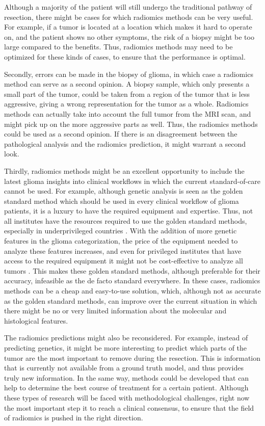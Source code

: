 Although a majority of the patient will still undergo the traditional pathway of resection, there might be cases for which radiomics methods can be very useful.
For example, if a \gls{tumor} is located at a location which makes it hard to operate on, and the patient shows no other symptoms, the risk of a biopsy might be too large compared to the benefits.
Thus, radiomics methods may need to be optimized for these kinds of cases, to ensure that the performance is optimal.

Secondly, errors can be made in the biopsy of glioma, in which case a radiomics method can serve as a second opinion.
A biopsy sample, which only presents a small part of the \gls{tumor}, could be taken from a region of the tumor that is less aggressive, giving a wrong representation for the \gls{tumor} as a whole.
Radiomics methods can actually take into account the full \gls{tumor} from the \gls{MRI} scan, and might pick up on the more aggressive parts as well.
Thus, the radiomics methods could be used as a second opinion.
If there is an disagreement between the pathological analysis and the radiomics prediction, it might warrant a second look.

Thirdly, radiomics methods might be an excellent opportunity to include  the latest glioma insights into clinical workflows in which the current standard-of-care cannot be used.
For example, although genetic analysis is seen as the golden standard method which should be used in every clinical workflow of glioma patients, it is a luxury to have the required equipment and expertise.
Thus, not all institutes have the resources required to use the golden standard methods, especially in underprivileged countries \autocite{santosh2019india}.
With the addition of more genetic features in the glioma categorization, the price of the equipment needed to analyze these features  increases, and even for privileged institutes that have access to the required equipment it might not be cost-effective to analyze all \glspl{tumor} \autocite{malzkorn2016practical,dewitt2017costIDH}.
This makes these golden standard methods, although preferable for their accuracy, infeasible as the de facto standard everywhere.
In these cases, radiomics methods can be a cheap and easy-to-use solution, which, although not as accurate as the golden standard methods, can improve over the current situation in which there might be no or very limited information about the molecular and histological features.

The radiomics predictions might also be reconsidered.
For example, instead of predicting genetics, it might be more interesting to predict which parts of the \gls{tumor} are the most important to remove during the resection.
This is information that is currently not available from a ground truth model, and thus provides truly new information.
In the same way, methods could be developed that can help to determine the best course of treatment for a certain patient.
Although these types of research will be faced with methodological challenges, right now the most important step it to reach a clinical consensus, to ensure that the field of radiomics is pushed in the right direction.

